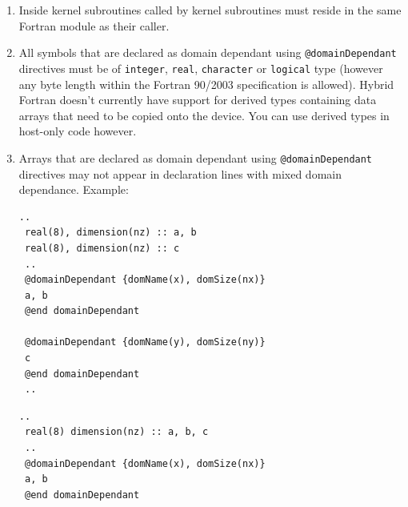 \begin{enumerate}
 \item Inside kernel subroutines called by kernel subroutines must reside in the same Fortran module as their caller.
 \item All symbols that are declared as domain dependant using \verb|@domainDependant| directives must be of \verb|integer|, \verb|real|, \verb|character| or \verb|logical| type (however any byte length within the Fortran 90/2003 specification is allowed). Hybrid Fortran doesn't currently have support for derived types containing data arrays that need to be copied onto the device. You can use derived types in host-only code however.
 \item Arrays that are declared as domain dependant using \verb|@domainDependant| directives may not appear in declaration lines with mixed domain dependance. Example:
 \begin{lstlisting}[name=exampleMixedOK, label=listing:exampleMixedOK, caption={This is ok.}]
 ..
 real(8), dimension(nz) :: a, b
 real(8), dimension(nz) :: c
 ..
 @domainDependant {domName(x), domSize(nx)}
 a, b
 @end domainDependant

 @domainDependant {domName(y), domSize(ny)}
 c
 @end domainDependant
 ..
 \end{lstlisting}

 \begin{lstlisting}[name=exampleMixedNotOK, label=listing:exampleMixedNotOK, caption={This is not ok.}]
 ..
 real(8) dimension(nz) :: a, b, c
 ..
 @domainDependant {domName(x), domSize(nx)}
 a, b
 @end domainDependant


\end{lstlisting}
\end{enumerate}
